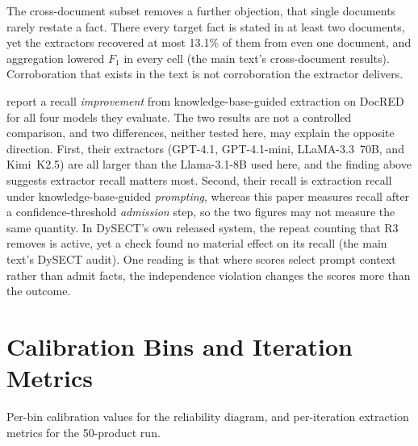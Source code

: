 \documentclass[11pt]{article}
\begin{document}
The cross-document subset removes a further objection, that single
documents rarely restate a fact. There every target fact is stated in
at least two documents, yet the extractors recovered at most 13.1\% of
them from even one document, and aggregation lowered $F_1$ in every cell
(the main text's cross-document results). Corroboration that exists in the
text is not corroboration the extractor delivers.

\citet{aminnaseri2026dysect} report a recall \emph{improvement} from
knowledge-base-guided extraction on DocRED for all four models they
evaluate. The two results are not a controlled comparison, and two
differences, neither tested here, may explain the opposite direction.
First, their extractors (GPT-4.1, GPT-4.1-mini, LLaMA-3.3~70B, and
Kimi~K2.5) are all larger than the Llama-3.1-8B used here, and the
finding above suggests extractor recall matters most. Second, their
recall is extraction recall under knowledge-base-guided
\emph{prompting}, whereas this paper measures recall after a
confidence-threshold \emph{admission} step, so the two figures may not
measure the same quantity. In DySECT's own released system, the repeat
counting that R3 removes is active, yet a check found no material effect
on its recall (the main text's DySECT audit). One reading is that
where scores select prompt context rather than admit facts, the
independence violation changes the scores more than the outcome.

\section{Calibration Bins and Iteration Metrics}
\label{sec:s8}

Per-bin calibration values for the reliability diagram, and per-iteration extraction metrics for the 50-product run.
\end{document}

